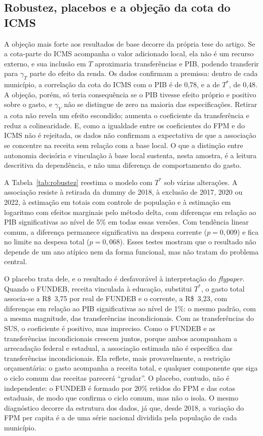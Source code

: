 \subsection{Robustez, placebos e a objeção da cota do ICMS}\label{sec:objecao}

A objeção mais forte aos resultados de base decorre da própria tese do artigo. Se a cota-parte do ICMS acompanha o valor adicionado local, ela não é um recurso externo, e sua inclusão em $T$ aproximaria transferências e PIB, podendo transferir para $\gamma_T$ parte do efeito da renda. Os dados confirmam a premissa: dentro de cada município, a correlação da cota do ICMS com o PIB é de 0,78, e a de $T^{*}$, de 0,48. A objeção, porém, só teria consequência se o PIB tivesse efeito próprio e positivo sobre o gasto, e $\gamma_Y$ não se distingue de zero na maioria das especificações. Retirar a cota não revela um efeito escondido; aumenta o coeficiente da transferência e reduz a colinearidade. E, como a igualdade entre os coeficientes do FPM e do ICMS não é rejeitada, os dados não confirmam a expectativa de que a associação se concentre na receita sem relação com a base local. O que a distinção entre autonomia decisória e vinculação à base local sustenta, nesta amostra, é a leitura descritiva da dependência, e não uma diferença de comportamento do gasto.



A Tabela~\ref{tab:robustez} reestima o modelo com $T^{*}$ sob várias alterações. A associação resiste à retirada da dummy de 2018, à exclusão de 2017, 2020 ou 2022, à estimação em totais com controle de população e à estimação em logaritmo com efeitos marginais pelo método delta, com diferenças em relação ao PIB significativas ao nível de 5\% em todas essas versões. Com tendência linear comum, a diferença permanece significativa na despesa corrente ($p = 0{,}009$) e fica no limite na despesa total ($p = 0{,}068$). Esses testes mostram que o resultado não depende de um ano atípico nem da forma funcional, mas não tratam do problema central.

O placebo trata dele, e o resultado é desfavorável à interpretação do \textit{flypaper}. Quando o FUNDEB, receita vinculada à educação, substitui $T^{*}$, o gasto total associa-se a R\$~3,75 por real de FUNDEB e o corrente, a R\$~3,23, com diferenças em relação ao PIB significativas ao nível de 1\%: o mesmo padrão, com a mesma magnitude, das transferências incondicionais. Com as transferências do SUS, o coeficiente é positivo, mas impreciso. Como o FUNDEB e as transferências incondicionais crescem juntos, porque ambos acompanham a arrecadação federal e estadual, a associação estimada não é específica das transferências incondicionais. Ela reflete, mais provavelmente, a restrição orçamentária: o gasto acompanha a receita total, e qualquer componente que siga o ciclo comum das receitas parecerá ``grudar''. O placebo, contudo, não é independente: o FUNDEB é formado por 20\% retidos do FPM e das cotas estaduais, de modo que confirma o ciclo comum, mas não o isola. O mesmo diagnóstico decorre da estrutura dos dados, já que, desde 2018, a variação do FPM per capita é a de uma série nacional dividida pela população de cada município.

